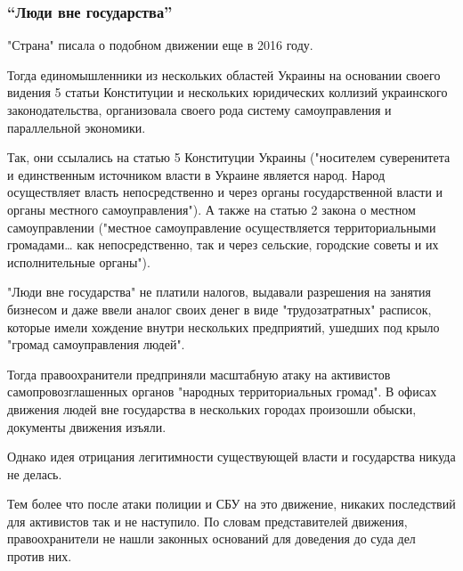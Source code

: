  
 
 
 
 
\subsubsection{\enquote{Люди вне государства}}

"Страна" писала о подобном движении еще в 2016 году.

Тогда единомышленники из нескольких областей Украины на основании своего
видения 5 статьи Конституции и нескольких юридических коллизий украинского
законодательства, организовала своего рода систему самоуправления и
параллельной экономики.

Так, они ссылались на статью 5 Конституции Украины ("носителем
суверенитета и единственным источником власти в Украине является народ.
Народ осуществляет власть непосредственно и через органы государственной
власти и органы местного самоуправления"). А также на статью 2 закона о
местном самоуправлении ("местное самоуправление осуществляется
территориальными громадами… как непосредственно, так и через сельские,
городские советы и их исполнительные органы"). 

"Люди вне государства" не платили налогов, выдавали разрешения на занятия
бизнесом и даже ввели аналог своих денег в виде "трудозатратных" расписок,
которые имели хождение внутри нескольких предприятий, ушедших под крыло
"громад самоуправления людей".

Тогда правоохранители предприняли масштабную атаку на активистов
самопровозглашенных органов "народных территориальных громад". В офисах
движения людей вне государства в нескольких городах произошли обыски,
документы движения изъяли.

Однако идея отрицания легитимности существующей власти и государства
никуда не делась.

Тем более что после атаки полиции и СБУ на это движение, никаких
последствий для активистов так и не наступило. По словам представителей
движения, правоохранители не нашли законных оснований для доведения до
суда дел против них. 

